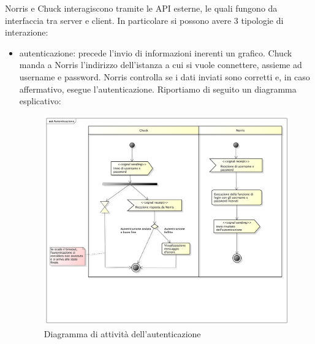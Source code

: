         
        Norris e Chuck interagiscono tramite le API esterne, le quali fungono da interfaccia tra server e client. In particolare si possono avere 3 tipologie di interazione:
        \begin{itemize}
            \item autenticazione: precede l'invio di informazioni inerenti un grafico. Chuck manda a Norris l'indirizzo dell'istanza a cui si vuole connettere, assieme ad username e password. Norris controlla se i dati inviati sono corretti e, in caso affermativo, esegue l'autenticazione. Riportiamo di seguito un diagramma esplicativo:
        	\begin{figure}[H]\centering
        		\includegraphics[width=\textwidth]{SpecificaTecnica/Pics/Chuck/Autenticazione.pdf}
        		\caption{Diagramma di attività dell'autenticazione}
    		\end{figure}
	

\end{itemize}
